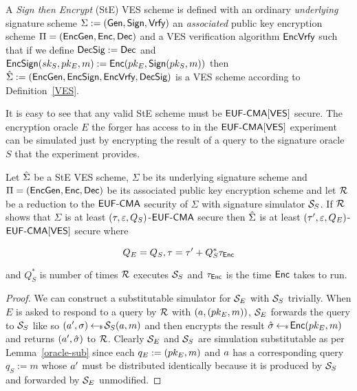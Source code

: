 \begin{definition}
A \emph{Sign then Encrypt} (StE) VES scheme is defined with an ordinary \emph{underlying} signature scheme $\Sigma := (\textsf{Gen}, \textsf{Sign}, \textsf{Vrfy})$ an \emph{associated} public key encryption scheme $\Pi = (\textsf{EncGen}, \textsf{Enc}, \textsf{Dec})$ and a VES verification algorithm $\textsf{EncVrfy}$ such that if we define $\textsf{DecSig} := \textsf{Dec}$ and $\textsf{EncSign}(sk_S, pk_E, m) := \textsf{Enc}(pk_E, \textsf{Sign}(pk_S, m))$ then $\hat{\Sigma} := (\textsf{EncGen}, \textsf{EncSign}, \textsf{EncVrfy}, \textsf{DecSig})$ is a VES scheme according to Definition~\ref{VES}.
\end{definition}

It is easy to see that any valid StE scheme must be $\textsf{EUF-CMA}[\textsf{VES}]$ secure.
The encryption oracle $E$ the forger has access to in the $\textsf{EUF-CMA}[\textsf{VES}]$ experiment can be simulated just by encrypting the result of a query to the signature oracle $S$ that the \EUFCMA experiment provides.

\begin{theorem}
  Let $\hat{\Sigma}$ be a StE VES scheme,  $\Sigma$ be its underlying signature scheme and $\Pi = (\textsf{EncGen}, \textsf{Enc}, \textsf{Dec})$ be its associated public key encryption scheme and let $\mathcal{R}$ be a reduction to the $\textsf{EUF-CMA}$ security of $\Sigma$ with signature simulator $\mathcal{S}_S$.
  If $\mathcal{R}$ shows that $\Sigma$ is at least $(\tau, \varepsilon, Q_S)$-$\textsf{EUF-CMA}$ secure then $\hat{\Sigma}$ is at least $(\tau', \varepsilon, Q_E)$-$\textsf{EUF-CMA}[\textsf{VES}]$ secure where

  \[ Q_E = Q_S, \tau = \tau' + Q^*_S\tau_{\textsf{Enc}} \]

  \hfill \break and $Q^*_S$ is number of times $\mathcal{R}$ executes $\mathcal{S}_S$ and $\tau_{\textsf{Enc}}$ is the time $\textsf{Enc}$ takes to run.
\end{theorem}

\begin{proof}
  We can construct a substitutable simulator for $\mathcal{S}_E$ with $\mathcal{S}_S$ trivially.
  When $E$ is asked to respond to a query by $\mathcal{R}$ with $(a, (pk_E, m))$, $\mathcal{S}_E$ forwards the query to $\mathcal{S}_S$ like so $(a', \sigma) \hskip2.3pt{\gets\!\!\mbox{\tiny${\$}$\normalsize}}\, \mathcal{S}_S(a, m)$
  and then encrypts the result $\hat{\sigma} \hskip2.3pt{\gets\!\!\mbox{\tiny${\$}$\normalsize}}\, \textsf{Enc}(pk_E, m)$ and returns $(a', \hat{\sigma})$ to $\mathcal{R}$.
  Clearly $\mathcal{S}_E$ and $\mathcal{S}_S$ are simulation substitutable as per Lemma~\ref{oracle-sub} since each $q_E := (pk_E, m)$ and $a$ has a corresponding query $q_S := m$ whose $a'$ must be distributed identically because it is produced by $\mathcal{S}_S$ and forwarded by $\mathcal{S}_E$ unmodified.
\end{proof}
